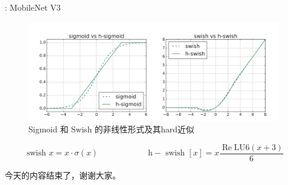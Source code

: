 \documentclass[UTF8, fontset=founder, aspectratio=43, 10pt, t]{ctexbeamer}
\begin{document}
\begin{frame}{\titleprefix: MobileNet V3}
	\begin{figure}
		\centering
		\includegraphics[width=0.9\linewidth]{Images/mobilenetv3}
		\caption{Sigmoid 和 Swish 的非线性形式及其hard近似}
		\label{fig:mobilenetv3}
	\end{figure}
	\[\text { swish } x=x \cdot \sigma(x)
	\hspace{1in}
	\mathrm{h}-\text { swish }[x]=x
	\frac{\operatorname{Re} \mathrm{L} \mathrm{U} 6(x+3)}{6}\]
\end{frame}

\begin{frame}
	今天的内容结束了，谢谢大家。
\end{frame}
\end{document}
